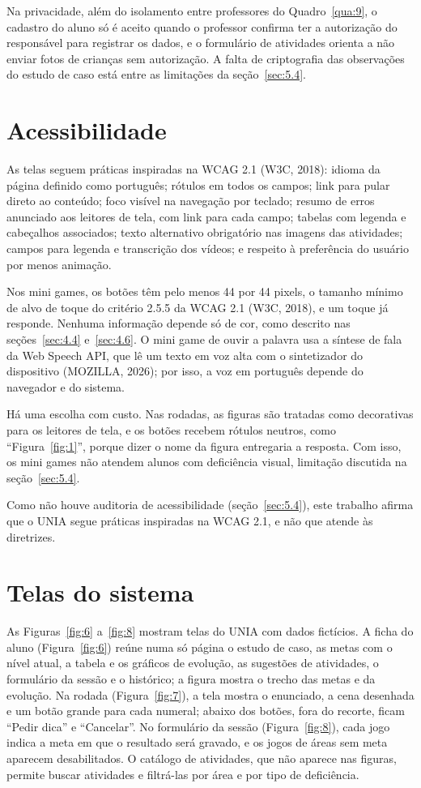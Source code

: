Na privacidade, além do isolamento entre professores do Quadro~\ref{qua:9}, o cadastro do aluno só é aceito quando o professor confirma ter a autorização do responsável para registrar os dados, e o formulário de atividades orienta a não enviar fotos de crianças sem autorização. A falta de criptografia das observações do estudo de caso está entre as limitações da seção~\ref{sec:5.4}.

\section{Acessibilidade}\label{sec:4.8}

As telas seguem práticas inspiradas na WCAG 2.1 (W3C, 2018): idioma da página definido como português; rótulos em todos os campos; link para pular direto ao conteúdo; foco visível na navegação por teclado; resumo de erros anunciado aos leitores de tela, com link para cada campo; tabelas com legenda e cabeçalhos associados; texto alternativo obrigatório nas imagens das atividades; campos para legenda e transcrição dos vídeos; e respeito à preferência do usuário por menos animação.

Nos mini games, os botões têm pelo menos 44 por 44 pixels, o tamanho mínimo de alvo de toque do critério 2.5.5 da WCAG 2.1 (W3C, 2018), e um toque já responde. Nenhuma informação depende só de cor, como descrito nas seções~\ref{sec:4.4} e~\ref{sec:4.6}. O mini game de ouvir a palavra usa a síntese de fala da Web Speech API, que lê um texto em voz alta com o sintetizador do dispositivo (MOZILLA, 2026); por isso, a voz em português depende do navegador e do sistema.

Há uma escolha com custo. Nas rodadas, as figuras são tratadas como decorativas para os leitores de tela, e os botões recebem rótulos neutros, como “Figura~\ref{fig:1}”, porque dizer o nome da figura entregaria a resposta. Com isso, os mini games não atendem alunos com deficiência visual, limitação discutida na seção~\ref{sec:5.4}.

Como não houve auditoria de acessibilidade (seção~\ref{sec:5.4}), este trabalho afirma que o UNIA segue práticas inspiradas na WCAG 2.1, e não que atende às diretrizes.

\section{Telas do sistema}\label{sec:4.9}

As Figuras~\ref{fig:6} a~\ref{fig:8} mostram telas do UNIA com dados fictícios. A ficha do aluno (Figura~\ref{fig:6}) reúne numa só página o estudo de caso, as metas com o nível atual, a tabela e os gráficos de evolução, as sugestões de atividades, o formulário da sessão e o histórico; a figura mostra o trecho das metas e da evolução. Na rodada (Figura~\ref{fig:7}), a tela mostra o enunciado, a cena desenhada e um botão grande para cada numeral; abaixo dos botões, fora do recorte, ficam “Pedir dica” e “Cancelar”. No formulário da sessão (Figura~\ref{fig:8}), cada jogo indica a meta em que o resultado será gravado, e os jogos de áreas sem meta aparecem desabilitados. O catálogo de atividades, que não aparece nas figuras, permite buscar atividades e filtrá-las por área e por tipo de deficiência.

